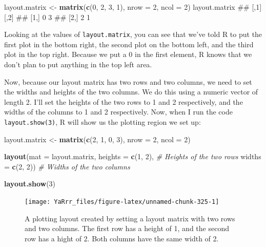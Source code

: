 \documentclass[]{book}
\newenvironment{Shaded}{\begin{snugshade}}{\end{snugshade}}
\newcommand{\KeywordTok}[1]{\textcolor[rgb]{0.13,0.29,0.53}{\textbf{#1}}}
\newcommand{\DataTypeTok}[1]{\textcolor[rgb]{0.13,0.29,0.53}{#1}}
\newcommand{\DecValTok}[1]{\textcolor[rgb]{0.00,0.00,0.81}{#1}}
\newcommand{\StringTok}[1]{\textcolor[rgb]{0.31,0.60,0.02}{#1}}
\newcommand{\CommentTok}[1]{\textcolor[rgb]{0.56,0.35,0.01}{\textit{#1}}}
\newcommand{\NormalTok}[1]{#1}
\theoremstyle{definition}
\theoremstyle{definition}
\theoremstyle{remark}
\begin{document}
\begin{Shaded}
\begin{Highlighting}[]
\NormalTok{layout.matrix <-}\StringTok{ }\KeywordTok{matrix}\NormalTok{(}\KeywordTok{c}\NormalTok{(}\DecValTok{0}\NormalTok{, }\DecValTok{2}\NormalTok{, }\DecValTok{3}\NormalTok{, }\DecValTok{1}\NormalTok{), }\DataTypeTok{nrow =} \DecValTok{2}\NormalTok{, }\DataTypeTok{ncol =} \DecValTok{2}\NormalTok{)}
\NormalTok{layout.matrix}
\NormalTok{##      [,1] [,2]}
\NormalTok{## [1,]    0    3}
\NormalTok{## [2,]    2    1}
\end{Highlighting}
\end{Shaded}

Looking at the values of \texttt{layout.matrix}, you can see that we've
told R to put the first plot in the bottom right, the second plot on the
bottom left, and the third plot in the top right. Because we put a 0 in
the first element, R knows that we don't plan to put anything in the top
left area.

Now, because our layout matrix has two rows and two columns, we need to
set the widths and heights of the two columns. We do this using a
numeric vector of length 2. I'll set the heights of the two rows to 1
and 2 respectively, and the widths of the columns to 1 and 2
respectively. Now, when I run the code \texttt{layout.show(3)}, R will
show us the plotting region we set up:

\begin{Shaded}
\begin{Highlighting}[]
\NormalTok{layout.matrix <-}\StringTok{ }\KeywordTok{matrix}\NormalTok{(}\KeywordTok{c}\NormalTok{(}\DecValTok{2}\NormalTok{, }\DecValTok{1}\NormalTok{, }\DecValTok{0}\NormalTok{, }\DecValTok{3}\NormalTok{), }\DataTypeTok{nrow =} \DecValTok{2}\NormalTok{, }\DataTypeTok{ncol =} \DecValTok{2}\NormalTok{)}

\KeywordTok{layout}\NormalTok{(}\DataTypeTok{mat =}\NormalTok{ layout.matrix,}
       \DataTypeTok{heights =} \KeywordTok{c}\NormalTok{(}\DecValTok{1}\NormalTok{, }\DecValTok{2}\NormalTok{), }\CommentTok{# Heights of the two rows}
       \DataTypeTok{widths =} \KeywordTok{c}\NormalTok{(}\DecValTok{2}\NormalTok{, }\DecValTok{2}\NormalTok{)) }\CommentTok{# Widths of the two columns}

\KeywordTok{layout.show}\NormalTok{(}\DecValTok{3}\NormalTok{)}
\end{Highlighting}
\end{Shaded}

\begin{figure}

{\centering \texttt{[image: YaRrr\_files/figure-latex/unnamed-chunk-325-1]} 

}

\caption{A plotting layout created by setting a layout matrix with two rows and two columns. The first row has a height of 1, and the second row has a hight of 2. Both columns have the same width of 2.}\label{fig:unnamed-chunk-325}
\end{figure}
\end{document}
